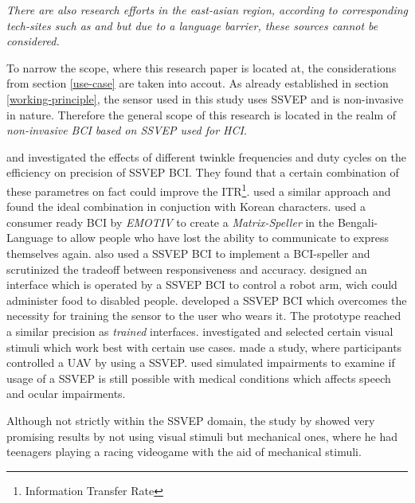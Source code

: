             \medskip

            \emph{There are also research efforts in the east-asian region, according to corresponding tech-sites such as \cite{GlobalTimes.20042021} and \cite{TechwireAsia.24052021} but due to a language barrier, these sources cannot be considered.}

            \medskip

            To narrow the scope, where this research paper is located at, the considerations from section \ref*{use-case} are taken into accout. As already established in section \ref*{working-principle}, the sensor used in this study uses SSVEP and is non-invasive in nature. Therefore the general scope of this research is located in the realm of \textit{non-invasive BCI based on SSVEP used for HCI}.

            \medskip

            \cite{Oralhan.2016} and \cite{Resalat.2011} investigated the effects of different twinkle frequencies and duty cycles on the efficiency on precision of SSVEP BCI. They found that a certain combination of these parametres on fact could improve the ITR\footnote{Information Transfer Rate}. \cite{Lee.2016} used a similar approach and found the ideal combination in conjuction with Korean characters.
            \cite{S.M.Abdullah.2014} used a consumer ready BCI by \textit{EMOTIV} to create a \textit{Matrix-Speller} in the Bengali-Language to allow people who have lost the ability to communicate to express themselves again. 
            \cite{Chen.2020} also used a SSVEP BCI to implement a BCI-speller and scrutinized the tradeoff between responsiveness and accuracy.
            \cite{Chen.2020} designed an interface which is operated by a SSVEP BCI to control a robot arm, wich could administer food to disabled people.
            \cite{Soroush.2018} developed a SSVEP BCI which overcomes the necessity for training the sensor to the user who wears it. The prototype reached a similar precision as \textit{trained} interfaces.
            \cite{Gergondet.2015} investigated and selected certain visual stimuli which work best with certain use cases.
            \cite{Merino.2017} made a study, where participants controlled a UAV by using a SSVEP.
            \cite{Peters.2018} used simulated impairments to examine if usage of a SSVEP is still possible with medical conditions which affects speech and ocular impairments.

            Although not strictly within the SSVEP domain, the study by \cite{Beveridge.2017} showed very promising results by not using visual stimuli but mechanical ones, where he had teenagers playing a racing videogame with the aid of mechanical stimuli.

